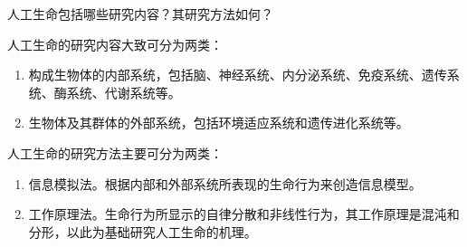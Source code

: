 \begin{question}
人工生命包括哪些研究内容？其研究方法如何？
\end{question}
\begin{solution}
人工生命的研究内容大致可分为两类：
	\begin{enumerate}
		\item 构成生物体的内部系统，包括脑、神经系统、内分泌系统、免疫系统、遗传系统、酶系统、代谢系统等。
		\item 生物体及其群体的外部系统，包括环境适应系统和遗传进化系统等。
	\end{enumerate} \par
人工生命的研究方法主要可分为两类：
	\begin{enumerate}
		\item 信息模拟法。根据内部和外部系统所表现的生命行为来创造信息模型。
		\item 工作原理法。生命行为所显示的自律分散和非线性行为，其工作原理是混沌和分形，以此为基础研究人工生命的机理。
	\end{enumerate}
\end{solution}